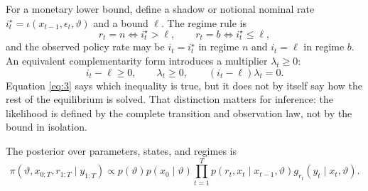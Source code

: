 \documentclass[11pt]{article}
\begin{document}
For a monetary lower bound, define a shadow or notional nominal rate
\(i_t^\star=\iota(x_{t-1},\epsilon_t,\vartheta)\) and a bound \(\ell\). The
regime rule is
\begin{equation}\label{eq:2}
 r_t=n \iff i_t^\star>\ell,\qquad
 r_t=b \iff i_t^\star\leq\ell,
\end{equation}
and the observed policy rate may be \(i_t=i_t^\star\) in regime \(n\) and
\(i_t=\ell\) in regime \(b\). An equivalent complementarity form introduces a
multiplier \(\lambda_t\geq0\):
\begin{equation}\label{eq:3}
 i_t-\ell\geq0,\qquad \lambda_t\geq0,\qquad
 (i_t-\ell)\lambda_t=0.
\end{equation}
Equation \eqref{eq:3} says which inequality is true, but it does not by
itself say how the rest of the equilibrium is solved. That distinction
matters for inference: the likelihood is defined by the complete transition
and observation law, not by the bound in isolation.

The posterior over parameters, states, and regimes is
\begin{equation}\label{eq:4}
 \pi(\vartheta,x_{0:T},r_{1:T}\mid y_{1:T})
 \propto p(\vartheta)p(x_0\mid\vartheta)
 \prod_{t=1}^T p(r_t,x_t\mid x_{t-1},\vartheta)
 g_{r_t}(y_t\mid x_t,\vartheta).
\end{equation}
\end{document}
